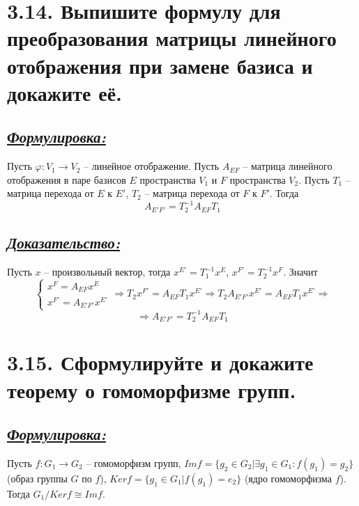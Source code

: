 \documentclass{article}
\begin{document}
\section*{\LARGE 3.14. Выпишите формулу для преобразования матрицы линейного отображения при замене базиса и докажите её. }
\subsection*{\Large \underline{\textit{Формулировка: }}}
Пусть $\varphi : V_1 \rightarrow V_2$ -- линейное отображение. Пусть $A_{EF}$ -- матрица линейного отображения в паре базисов $E$ пространства $V_1$ и $F$ пространства $V_2$. Пусть $T_1$ -- матрица перехода от $E$ к $E'$, $T_2$ --  матрица перехода от $F$ к $F'$. Тогда 
$$
A_{E'F'} = T_2^{-1}A_{EF}T_1
$$

\subsection*{\Large \underline{\textit{Доказательство: }}}
Пусть $x$ -- произвольный вектор, тогда $x^{E'} = T_1^{-1} x^E$, $x^{F'} = T_2^{-1} x^F$. Значит $$
\begin{cases}
x^{F} = A_{EF} x^{E} \\
x^{F'} = A_{E'F'} x^{E'}
\end{cases}
\Rightarrow
T_2 x^{F'} = A_{EF} T_1 x^{E'}
\Rightarrow
T_2 A_{E'F'} x^{E'} = A_{EF} T_1 x^{E'}
\Rightarrow
$$
$$
\Rightarrow
A_{E'F'} = T_2^{-1} A_{EF} T_1
$$

\section*{\LARGE 3.15. Сформулируйте и докажите теорему о гомоморфизме групп. }
\subsection*{\Large \underline{\textit{Формулировка: }}}

Пусть $f : G_1 \rightarrow G_2$ -- гомоморфизм групп,
\newline $Imf = \{g_2 \in G_2 | \exists g_1 \in G_1 : f(g_1) = g_2\}$ (образ группы $G$ по $f$), 
\newline $Kerf = \{g_1 \in G_1 | f(g_1) = e_2\}$ (ядро гомоморфизма $f$).
\newline Тогда $G_1/Kerf \cong Imf$.
\end{document}
